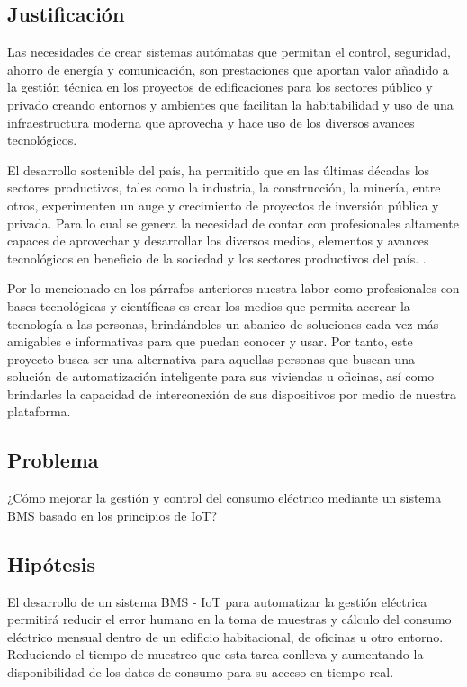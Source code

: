 \documentclass[a4paper, 12pt]{article}
\begin{document}
\subsection{Justificación}

Las necesidades de crear sistemas autómatas que permitan el control, seguridad, ahorro de energía y comunicación, son prestaciones que aportan valor añadido a la gestión técnica en los proyectos de edificaciones para los sectores público y privado creando entornos y ambientes que facilitan la habitabilidad y uso de una infraestructura moderna que aprovecha y hace uso de los diversos avances tecnológicos.

\vspace{0.25cm}
El desarrollo sostenible del país, ha permitido que en las últimas décadas los sectores productivos, tales como la industria, la construcción, la minería, entre otros, experimenten un auge y crecimiento de proyectos de inversión pública y privada. Para lo cual se genera la necesidad de contar con profesionales altamente capaces de aprovechar y desarrollar los diversos medios, elementos y avances tecnológicos en beneficio de la sociedad y los sectores productivos del país. \citep{ARTICLE:2}.

\vspace{0.25cm}
Por lo mencionado en los párrafos anteriores nuestra labor como profesionales con bases tecnológicas y científicas es crear los medios que permita acercar la tecnología a las personas, brindándoles un abanico de soluciones cada vez más amigables e informativas para que puedan conocer y usar. Por tanto, este proyecto busca ser una alternativa para aquellas personas que buscan una solución de automatización inteligente para sus viviendas u oficinas, así como brindarles la capacidad de interconexión de sus dispositivos por medio de nuestra plataforma.


\subsection{Problema}
¿Cómo mejorar la gestión y control del consumo eléctrico mediante un sistema BMS basado en los principios de IoT?


\subsection{Hipótesis}
El desarrollo de un sistema BMS - IoT para automatizar la gestión eléctrica permitirá reducir el error humano en la toma de muestras y cálculo del consumo eléctrico mensual dentro de un edificio habitacional, de oficinas u otro entorno. Reduciendo el tiempo de muestreo que esta tarea conlleva y aumentando la disponibilidad de los datos de consumo para su acceso en tiempo real.   
\end{document}
